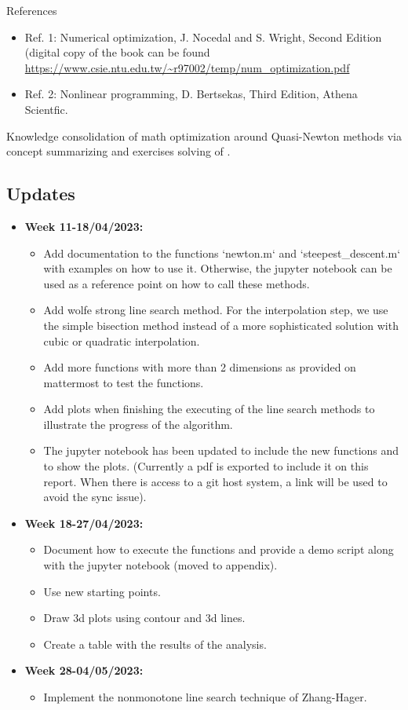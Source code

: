 \documentclass[a4paper,11pt]{article}
\numberwithin{equation}{section} %
\begin{document}
References
\begin{itemize}
 \item Ref. 1: Numerical optimization, J. Nocedal and S. Wright, Second Edition (digital copy of the book can be found \url{https://www.csie.ntu.edu.tw/~r97002/temp/num_optimization.pdf}
\item Ref. 2: Nonlinear programming, D. Bertsekas, Third Edition, Athena Scientfic.
\end{itemize}

Knowledge consolidation of math optimization around Quasi-Newton methods via concept summarizing and exercises solving of \cite{nocedal1999numerical, bertsekas1997nonlinear}.

\subsection{Updates}
\begin{itemize}
    \item \textbf{Week 11-18/04/2023:}
    \begin{itemize}
        \item Add documentation to the functions `newton.m` and `steepest\_descent.m` with examples on how to use it. Otherwise, the jupyter notebook can be used as a reference point on how to call these methods.
        \item Add wolfe strong line search method. For the interpolation step, we use the simple bisection method instead of a more sophisticated solution with cubic or quadratic interpolation.
        \item Add more functions with more than 2 dimensions as provided on mattermost to test the functions.
        \item Add plots when finishing the executing of the line search methods to illustrate the progress of the algorithm.
        \item The jupyter notebook has been updated to include the new functions and to show the plots. (Currently a pdf is exported to include it on this report. When there is access to a git host system, a link will be used to avoid the sync issue).
    \end{itemize}
    \item \textbf{Week 18-27/04/2023:}
    \begin{itemize}
        \item Document how to execute the functions and provide a demo script along with the jupyter notebook (moved to appendix).
        \item Use new starting points.
        \item Draw 3d plots using contour and 3d lines.
        \item Create a table with the results of the analysis.
    \end{itemize}
    \item \textbf{Week 28-04/05/2023:}
    \begin{itemize}
        \item Implement the nonmonotone line search technique of Zhang-Hager.
    \end{itemize}
\end{itemize}
\end{document}

